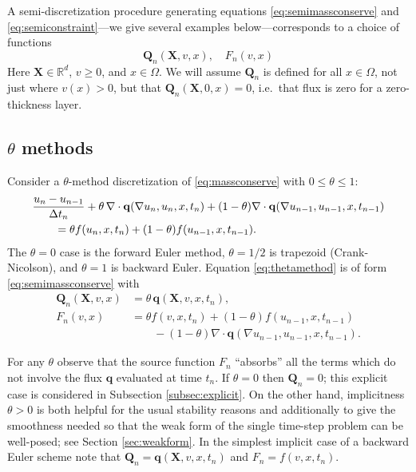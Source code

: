 \documentclass[final,leqno,onefignum,onetabnum]{siamltex1213bueler}
\newcommand\bq{\mathbf{q}}
\newcommand\bQ{\mathbf{Q}}
\newcommand\bX{\mathbf{X}}
\newcommand{\Div}{\nabla\cdot}
\renewcommand{\grad}{\nabla}
\newcommand\RR{\mathbb{R}}
\begin{document}
A semi-discretization procedure generating equations \eqref{eq:semimassconserve} and \eqref{eq:semiconstraint}---we give several examples below---corresponds to a choice of functions
\begin{equation}
\bQ_n(\bX,v,x), \quad F_n(v,x) \label{eq:functionalforms}
\end{equation}
Here $\bX\in\RR^d$, $v\ge 0$, and $x\in \Omega$.  We will assume $\bQ_n$ is defined for all $x\in\Omega$, not just where $v(x)>0$, but that $\bQ_n(\bX,0,x)=0$, i.e.~that flux is zero for a zero-thickness layer.

\subsection{$\theta$ methods}  \label{subsec:thetamethods}  Consider a $\theta$-method discretization \cite{MortonMayers2005} of \eqref{eq:massconserve} with $0\le \theta \le 1$:
\begin{align}
  &\frac{u_n - u_{n-1}}{\Delta t_n} + \theta\, \Div \bq(\grad u_n,u_n,x,t_n) + (1-\theta) \Div \bq(\grad u_{n-1},u_{n-1},x,t_{n-1}) \label{eq:thetamethod} \\
  &\qquad =  \theta f(u_n,x,t_n) + (1-\theta) f(u_{n-1},x,t_{n-1}). \notag
\end{align}
The $\theta=0$ case is the forward Euler method, $\theta=1/2$ is trapezoid (Crank-Nicolson), and $\theta=1$ is backward Euler.  Equation \eqref{eq:thetamethod} is of form \eqref{eq:semimassconserve} with
\begin{align*}
\bQ_n(\bX,v,x) &= \theta\, \bq(\bX,v,x,t_n), \\
F_n(v,x)       &= \theta f(v,x,t_n) + (1-\theta) f(u_{n-1},x,t_{n-1}) \\
               &\qquad - (1-\theta) \Div \bq(\grad u_{n-1},u_{n-1},x,t_{n-1}).
\end{align*}

For any $\theta$ observe that the source function $F_n$ ``absorbs'' all the terms which do not involve the flux $\bq$ evaluated at time $t_n$.  If $\theta=0$ then $\bQ_n=0$; this explicit case is considered in Subsection \ref{subsec:explicit}.  On the other hand, implicitness $\theta>0$ is both helpful for the usual stability reasons \cite{MortonMayers2005} and additionally to give the smoothness needed so that the weak form of the single time-step problem can be well-posed; see Section \ref{sec:weakform}.  In the simplest implicit case of a backward Euler scheme note that $\bQ_n = \bq(\bX,v,x,t_n)$ and $F_n = f(v,x,t_n)$.
\end{document}
